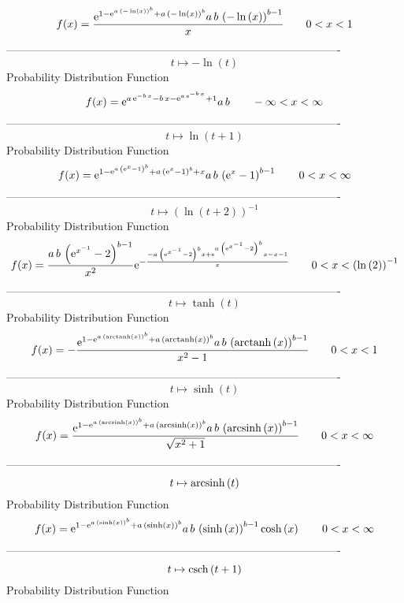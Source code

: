 \documentclass[12pt]{article}
\begin{document}
$$  f(x)={\frac {{{\rm e}^{1-{{\rm e}^{a\, \left( -\ln  \left( x \right) 
 \right) ^{b}}}+a\, \left( -\ln  \left( x \right)  \right) ^{b}}}a\,b
\, \left( -\ln  \left( x \right)  \right) ^{b-1}}{x}}
 \qquad0
 < x < 1
$$-------------------------------------------------------------------------------------------  \\$$t\mapsto -\ln  \left( t \right) 
$$Probability Distribution Function 
$$  f(x)={{\rm e}^{a\,{{\rm e}^{-b\,x}}-b\,x-{{\rm e}^{a\,{{\rm e}^{-b\,x}}}}+1
}}a\,b
 \qquad-\infty 
 < x < \infty 
$$-------------------------------------------------------------------------------------------  \\$$t\mapsto \ln  \left( t+1 \right) 
$$Probability Distribution Function 
$$  f(x)={{\rm e}^{1-{{\rm e}^{a\, \left( {{\rm e}^{x}}-1 \right) ^{b}}}+a\,
 \left( {{\rm e}^{x}}-1 \right) ^{b}+x}}a\,b\, \left( {{\rm e}^{x}}-1
 \right) ^{b-1}
 \qquad0
 < x < \infty 
$$-------------------------------------------------------------------------------------------  \\$$t\mapsto  \left( \ln  \left( t+2 \right)  \right) ^{-1}
$$Probability Distribution Function 
$$  f(x)={\frac {a\,b\, \left( {{\rm e}^{{x}^{-1}}}-2 \right) ^{b-1}}{{x}^{2}}{
{\rm e}^{-{\frac {-a\, \left( {{\rm e}^{{x}^{-1}}}-2 \right) ^{b}x+{
{\rm e}^{a\, \left( {{\rm e}^{{x}^{-1}}}-2 \right) ^{b}}}x-x-1}{x}}}}}
 \qquad0
 < x <  \left( \ln  \left( 2 \right)  \right) ^{-1}
$$-------------------------------------------------------------------------------------------  \\$$t\mapsto \tanh \left( t \right) 
$$Probability Distribution Function 
$$  f(x)=-{\frac {{{\rm e}^{1-{{\rm e}^{a\, \left( {\rm arctanh} \left(x\right)
 \right) ^{b}}}+a\, \left( {\rm arctanh} \left(x\right) \right) ^{b}}}
a\,b\, \left( {\rm arctanh} \left(x\right) \right) ^{b-1}}{{x}^{2}-1}}
 \qquad0
 < x < 1
$$-------------------------------------------------------------------------------------------  \\$$t\mapsto \sinh \left( t \right) 
$$Probability Distribution Function 
$$  f(x)={\frac {{{\rm e}^{1-{{\rm e}^{a\, \left( {\rm arcsinh} \left(x\right)
 \right) ^{b}}}+a\, \left( {\rm arcsinh} \left(x\right) \right) ^{b}}}
a\,b\, \left( {\rm arcsinh} \left(x\right) \right) ^{b-1}}{\sqrt {{x}^
{2}+1}}}
 \qquad0
 < x < \infty 
$$-------------------------------------------------------------------------------------------  \\$$t\mapsto {\rm arcsinh} \left(t\right)
$$Probability Distribution Function 
$$  f(x)={{\rm e}^{1-{{\rm e}^{a\, \left( \sinh \left( x \right)  \right) ^{b}}
}+a\, \left( \sinh \left( x \right)  \right) ^{b}}}a\,b\, \left( \sinh
 \left( x \right)  \right) ^{b-1}\cosh \left( x \right) 
 \qquad0
 < x < \infty 
$$-------------------------------------------------------------------------------------------  \\$$t\mapsto {\rm csch} \left(t+1\right)
$$Probability Distribution Function 
\end{document}
